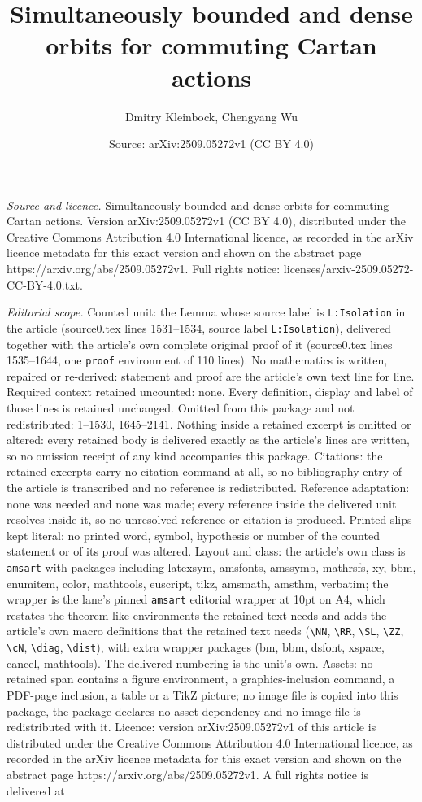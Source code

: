\documentclass[10pt,a4paper]{amsart}
\title[Simultaneously bounded and dense orbits for commuting Cartan]{Simultaneously bounded and dense orbits for commuting Cartan actions}
\author{Dmitry Kleinbock, Chengyang Wu}
\date{Source: arXiv:2509.05272v1 (CC BY 4.0)}
\begin{document}
\maketitle

\noindent\emph{Source and licence.} Simultaneously bounded and dense orbits for commuting Cartan actions. Version arXiv:2509.05272v1 (CC BY 4.0), distributed under the Creative Commons Attribution 4.0 International licence, as recorded in the arXiv licence metadata for this exact version and shown on the abstract page https://arxiv.org/abs/2509.05272v1. Full rights notice: licenses/arxiv-2509.05272-CC-BY-4.0.txt.\par\smallskip

\noindent\textit{Editorial scope.} Counted unit: the Lemma whose source label is \texttt{L:Isolation} in the article (source0.tex lines 1531--1534, source label \texttt{L:Isolation}), delivered together with the article's own complete original proof of it (source0.tex lines 1535--1644, one \texttt{proof} environment of 110 lines). No mathematics is written, repaired or re-derived: statement and proof are the article's own text line for line. Required context retained uncounted: none. Every definition, display and label of those lines is retained unchanged. Omitted from this package and not redistributed: 1--1530, 1645--2141. Nothing inside a retained excerpt is omitted or altered: every retained body is delivered exactly as the article's lines are written, so no omission receipt of any kind accompanies this package. Citations: the retained excerpts carry no citation command at all, so no bibliography entry of the article is transcribed and no reference is redistributed. Reference adaptation: none was needed and none was made; every reference inside the delivered unit resolves inside it, so no unresolved reference or citation is produced. Printed slips kept literal: no printed word, symbol, hypothesis or number of the counted statement or of its proof was altered. Layout and class: the article's own class is \texttt{amsart} with packages including latexsym, amsfonts, amssymb, mathrsfs, xy, bbm, enumitem, color, mathtools, euscript, tikz, amsmath, amsthm, verbatim; the wrapper is the lane's pinned \texttt{amsart} editorial wrapper at 10pt on A4, which restates the theorem-like environments the retained text needs and adds the article's own macro definitions that the retained text needs (\texttt{\textbackslash NN}, \texttt{\textbackslash RR}, \texttt{\textbackslash SL}, \texttt{\textbackslash ZZ}, \texttt{\textbackslash cN}, \texttt{\textbackslash diag}, \texttt{\textbackslash dist}), with extra wrapper packages (bm, bbm, dsfont, xspace, cancel, mathtools). The delivered numbering is the unit's own. Assets: no retained span contains a figure environment, a graphics-inclusion command, a PDF-page inclusion, a table or a TikZ picture; no image file is copied into this package, the package declares no asset dependency and no image file is redistributed with it. Licence: version arXiv:2509.05272v1 of this article is distributed under the Creative Commons Attribution 4.0 International licence, as recorded in the arXiv licence metadata for this exact version and shown on the abstract page https://arxiv.org/abs/2509.05272v1. A full rights notice is delivered at 
\end{document}
